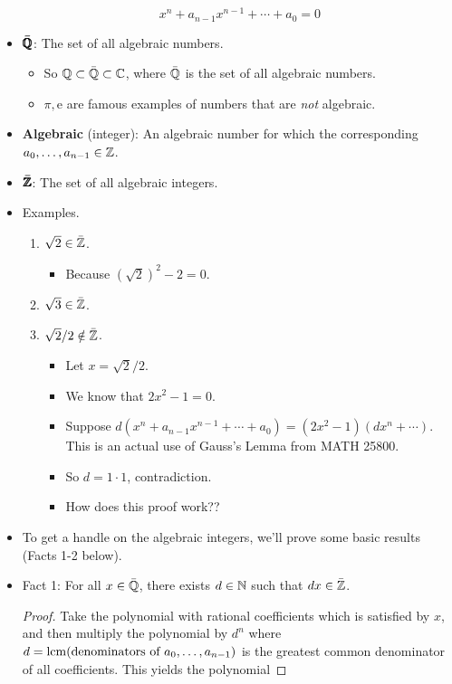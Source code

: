 \documentclass[../notes.tex]{subfiles}
\begin{document}
\begin{itemize}
\begin{equation*}
        x^n+a_{n-1}x^{n-1}+\cdots+a_0 = 0
    \end{equation*}
    \item $\bm{\bar{\pmb{\mathbb{Q}}}}$: The set of all algebraic numbers.
    \begin{itemize}
        \item So $\mathbb{Q}\subset\bar{\mathbb{Q}}\subset\mathbb{C}$, where $\bar{\mathbb{Q}}$ is the set of all algebraic numbers.
        \item $\pi,\text{e}$ are famous examples of numbers that are \emph{not} algebraic.
    \end{itemize}
    \item \textbf{Algebraic} (integer): An algebraic number for which the corresponding $a_0,\dots,a_{n-1}\in\mathbb{Z}$.
    \item $\bm{\bar{\pmb{\mathbb{Z}}}}$: The set of all algebraic integers.
    \item Examples.
    \begin{enumerate}
        \item $\sqrt{2}\in\bar{\mathbb{Z}}$.
        \begin{itemize}
            \item Because $(\sqrt{2})^2-2=0$.
        \end{itemize}
        \item $\sqrt{3}\in\bar{\mathbb{Z}}$.
        \item $\sqrt{2}/2\notin\bar{\mathbb{Z}}$.
        \begin{itemize}
            \item Let $x=\sqrt{2}/2$.
            \item We know that $2x^2-1=0$.
            \item Suppose $d(x^n+a_{n-1}x^{n-1}+\cdots+a_0)=(2x^2-1)(dx^n+\cdots)$. This is an actual use of Gauss's Lemma from MATH 25800.
            \item So $d=1\cdot 1$, contradiction.
            \item How does this proof work??
        \end{itemize}
    \end{enumerate}
    \item To get a handle on the algebraic integers, we'll prove some basic results (Facts 1-2 below).
    \item Fact 1: For all $x\in\bar{\mathbb{Q}}$, there exists $d\in\mathbb{N}$ such that $dx\in\bar{\mathbb{Z}}$.
    \begin{proof}
        Take the polynomial with rational coefficients which is satisfied by $x$, and then multiply the polynomial by $d^n$ where $d=\operatorname{lcm}(\text{denominators of }a_0,\dots,a_{n-1})$ is the greatest common denominator of all coefficients. This yields the polynomial

\end{proof}
\end{itemize}
\end{document}
